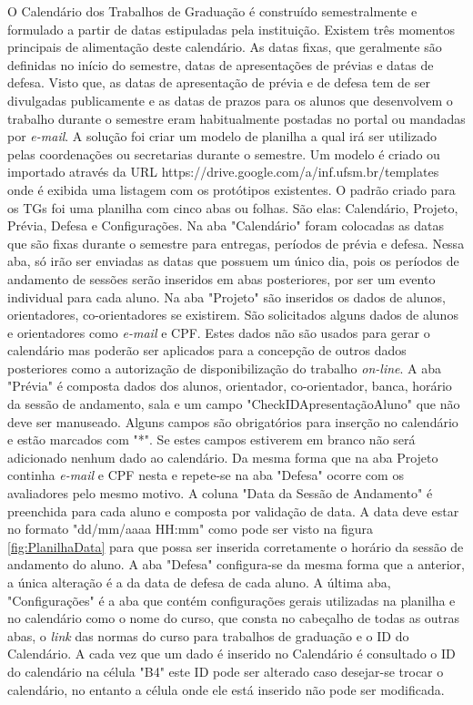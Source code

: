 O Calendário dos Trabalhos de Graduação é construído semestralmente e formulado a partir de datas estipuladas pela instituição. Existem três momentos principais de alimentação deste calendário. As datas fixas, que geralmente são definidas no início do semestre, datas de apresentações de prévias e datas de defesa. Visto que, as datas de apresentação de prévia e de defesa tem de ser divulgadas publicamente e as datas de prazos para os alunos que desenvolvem o trabalho durante o semestre eram habitualmente postadas no portal ou mandadas por \emph{e-mail}. A solução foi criar um modelo de planilha a qual irá ser utilizado pelas coordenações ou secretarias durante o semestre. Um modelo é criado ou importado através da URL https://drive.google.com/a/inf.ufsm.br/templates onde é exibida uma listagem com os protótipos existentes. O padrão criado para os TGs foi uma planilha com cinco abas ou folhas. São elas: Calendário, Projeto, Prévia, Defesa e Configurações. Na aba "Calendário" foram colocadas as datas que são fixas durante o semestre para entregas, períodos de prévia e defesa. Nessa aba, só irão ser enviadas as datas que possuem um único dia, pois os períodos de andamento de sessões serão inseridos em abas posteriores, por ser um evento individual para cada aluno. Na aba "Projeto" são inseridos os dados de alunos, orientadores, co-orientadores se existirem. São solicitados alguns dados de alunos e orientadores como \emph{e-mail} e CPF. Estes dados não são usados para gerar o calendário mas poderão ser aplicados para a concepção de outros dados posteriores como a autorização de disponibilização do trabalho \emph{on-line}. A aba "Prévia" é composta dados dos alunos, orientador, co-orientador, banca, horário da sessão de andamento, sala e um campo "CheckIDApresentaçãoAluno" que não deve ser manuseado. Alguns campos são obrigatórios para inserção no calendário e estão marcados com "*". Se estes campos estiverem em branco não será adicionado nenhum dado ao calendário. Da mesma forma que na aba Projeto continha \emph{e-mail} e CPF nesta e repete-se na aba "Defesa" ocorre com os avaliadores pelo mesmo motivo. A coluna "Data da Sessão de Andamento" é preenchida para cada aluno e composta por validação de data. A data deve estar no formato "dd/mm/aaaa HH:mm" como pode ser visto na figura \ref{fig:PlanilhaData} para que possa ser inserida corretamente o horário da sessão de andamento do aluno. A aba "Defesa" configura-se da mesma forma que a anterior, a única alteração é a da data de defesa de cada aluno. A última aba, "Configurações" é a aba que contém configurações gerais utilizadas na planilha e no calendário como o nome do curso, que consta no cabeçalho de todas as outras abas, o \emph{link} das normas do curso para trabalhos de graduação e o ID do Calendário. A cada vez que um dado é inserido no Calendário é consultado o ID do calendário na célula "B4" este ID pode ser alterado caso desejar-se trocar o calendário, no entanto a célula onde ele está inserido não pode ser modificada. 

